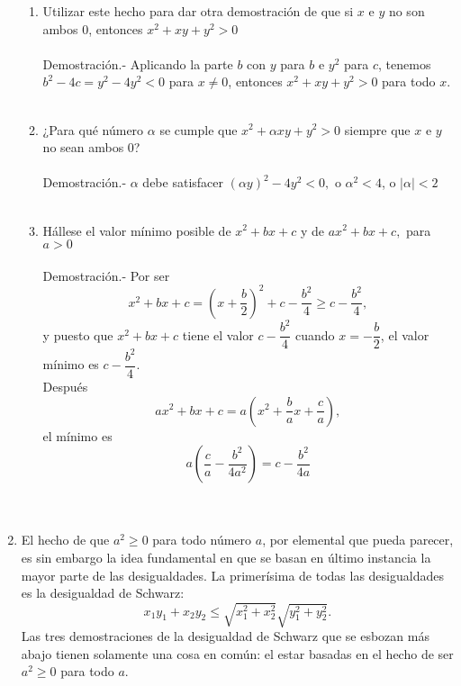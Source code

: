\begin{enumerate}[\bfseries 1.]
\begin{enumerate}[\bfseries (a)]
\item Utilizar este hecho para dar otra demostración de que si $x$ e $y$ no son ambos $0$, entonces $x^2+xy+y^2>0$\\\\
Demostración.- Aplicando la parte $b$ con $y$ para $b$ e $y^2$ para $c$, tenemos $b^2-4c=y^2-4y^2<0$ para $x \neq 0$, entonces $x^2+xy+y^2>0$ para todo $x$.\\\\ 
\item ¿Para qué número $\alpha$ se cumple que $x^2+\alpha xy + y^2>0$ siempre que $x$ e $y$ no sean ambos $0$?\\\\
Demostración.- \; $\alpha$ debe satisfacer $(\alpha y)^2-4y^2<0,$ o $\alpha^2<4$, o $|\alpha|<2$\\\\

\item Hállese el valor mínimo posible de $x^2+bx+c$ y de $ax^2+bx+c,$ para $a>0$\\\\
Demostración.- \; Por ser $$x^2+bx+c=\left( x+\dfrac{b}{2} \right)^2+ c-\dfrac{b^2}{4}\geq c- \dfrac{b^2}{4},$$ y puesto que $x^2+bx+c$ tiene el valor $c- \dfrac{b^2}{4}$ cuando $x=-\dfrac{b}{2}$, el valor mínimo es $c-\dfrac{b^2}{4}$.\\ Después $$ax^2+bx+c= a \left( x^2+\dfrac{b}{a}x+\dfrac{c}{a} \right),$$ el mínimo es $$a\left( \dfrac{c}{a} - \dfrac{b^2}{4a^2} \right) = c - \dfrac{b^2}{4a}$$\\\\
\end{enumerate}

\item  El hecho de que $a^2 \geq 0$ para todo número $a$, por elemental que pueda parecer, es sin embargo la idea fundamental en que se basan en último instancia la mayor parte de las desigualdades. La primerísima de todas las desigualdades es la desigualdad de Schwarz: $$x_1y_1 + x_2y_2 \leq \sqrt{x_1^2 +x_2^2}\sqrt{y_1^2+y_2^2}.$$ Las tres demostraciones de la desigualdad de Schwarz que se esbozan más abajo tienen solamente una cosa en común: el estar basadas en el hecho de ser $a^2\geq 0$ para todo $a$.
\begin{enumerate}[\bfseries (a)]


\end{enumerate}
\end{enumerate}
